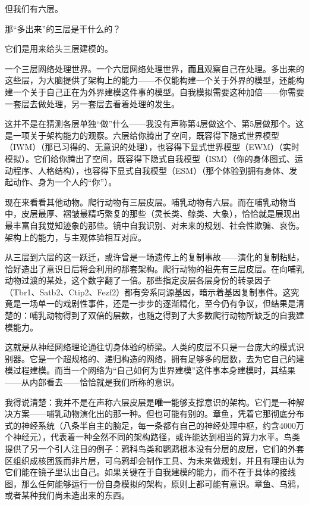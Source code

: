 \documentclass[11pt, twoside, openright]{book}
\begin{document}
但我们有六层。

那“多出来”的三层是干什么的？

它们是用来给头三层建模的。

一个三层网络处理世界。一个六层网络处理世界，\textbf{而且}观察自己在处理。多出来的这些层，为大脑提供了架构上的能力------不仅能构建一个关于外界的模型，还能构建一个关于自己正在为外界建模这件事的模型。自我模拟需要这种加倍------你需要一套层去做处理，另一套层去看着处理的发生。

这并不是在猜测各层单独“做”什么------我没有声称第4层做这个、第5层做那个。这是一项关于架构能力的观察。六层给你腾出了空间，既容得下隐式世界模型（IWM）（那已习得的、无意识的处理），也容得下显式世界模型（EWM）（实时模拟）。它们给你腾出了空间，既容得下隐式自我模型（ISM）（你的身体图式、运动程序、人格结构），也容得下显式自我模型（ESM）（那个体验到拥有身体、发起动作、身为一个人的“你”）。

现在来看看其他动物。爬行动物有三层皮层。哺乳动物有六层。而在哺乳动物当中，皮层最厚、褶皱最精巧繁复的那些（灵长类、鲸类、大象），恰恰就是展现出最丰富自我觉知迹象的那些。镜中自我识别、对未来的规划、社会性欺骗、哀伤。架构上的能力，与主观体验相互对应。

从三层到六层的这一跃迁，或许曾是一场遗传上的复制事故------演化的复制粘贴，恰好造出了意识日后将会利用的那套架构。爬行动物的祖先有三层皮层。在向哺乳动物过渡的某处，这个数字翻了一倍。那些指定皮层各层身份的转录因子（Tbr1、Satb2、Ctip2、Fezf2）都有旁系同源基因，暗示着基因复制事件。这究竟是一场单一的戏剧性事件，还是一步步的逐渐精化，至今仍有争议，但结果是清楚的：哺乳动物得到了双倍的层数，也随之得到了大多数爬行动物所缺乏的自我建模能力。

这就是从神经网络理论通往切身体验的桥梁。人类的皮层不只是一台庞大的模式识别器。它是一个超规格的、递归构造的网络，拥有足够多的层数，去为它自己的建模过程建模。而当一个网络为“自己如何为世界建模”这件事本身建模时，其结果------从内部看去------恰恰就是我们所称的意识。

我得说清楚：我并不是在声称六层皮层是\textbf{唯一}能够支撑意识的架构。它们是一种解决方案------哺乳动物演化出的那一种。但也可能有别的。章鱼，凭着它那彻底分布式的神经系统（八条半自主的腕足，每一条都有自己的神经处理中枢，约含4000万个神经元），代表着一种全然不同的架构路径，或许能达到相当的算力水平。鸟类提供了另一个引人注目的例子：鸦科鸟类和鹦鹉根本没有分层的皮层，它们的外套区组织成核团簇而非片层，可乌鸦却会制作工具、为未来做规划，并且有理由认为它们能在镜子里认出自己。如果关键在于自我建模的能力，而不在于具体的接线图，那么任何能够运行一份自身模拟的架构，原则上都可能有意识。章鱼、乌鸦，或者某种我们尚未造出来的东西。
\end{document}
